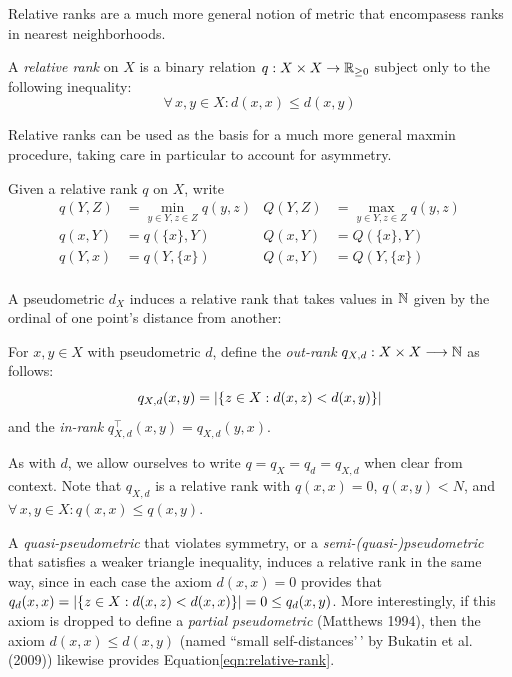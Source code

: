\documentclass{article}
\begin{document}
Relative ranks are a much more general notion of metric that encompasess
ranks in nearest neighborhoods.

\begin{definition}
    A \emph{relative rank} on $X$ is a binary relation $q: X \times X \to \mathbb{R}_{\geq 0}$ subject only to the following inequality:
    \begin{equation}\label{eqn:relative-rank}
        \forall\, x,y \in X : d(x,x) \leq d(x,y)
    \end{equation}
\end{definition}

Relative ranks can be used as the basis for a much more general maxmin
procedure, taking care in particular to account for asymmetry.

Given a relative rank \(q\) on \(X\), write \begin{align*}
    q(Y,Z) &= \min_{y\in Y,z\in Z}{q(y,z)} & Q(Y,Z) &= \max_{y\in Y,z\in Z}{q(y,z)} \\
    q(x,Y) &= q(\{x\},Y)                   & Q(x,Y) &= Q(\{x\},Y) \\
    q(Y,x) &= q(Y,\{x\})                   & Q(x,Y) &= Q(Y,\{x\}) \\
\end{align*}

A pseudometric \(d_X\) induces a relative rank that takes values in
\(\mathbb{N}\) given by the ordinal of one point's distance from another:

\begin{definition}
    For $x,y\in X$ with pseudometric $d$, define the \emph{out-rank} $q_{X,d} : X \times X \longrightarrow \mathbb{N}$ as follows:
    \begin{equation}\label{eqn:out-rank}
        q_{X,d}(x,y)=\abs{\{z\in X \where d(x,z) < d(x,y)\}}%
    \end{equation}
    and the \emph{in-rank} $q_{X,d}^\top(x,y) = q_{X,d}(y,x)$.
\end{definition}

As with \(d\), we allow ourselves to write \(q=q_X=q_d=q_{X,d}\) when
clear from context. Note that \(q_{X,d}\) is a relative rank with
\(q(x,x)=0\), \(q(x,y) < N\), and
\(\forall\, x,y \in X : q(x,x) \leq q(x,y)\).

A \emph{quasi-pseudometric} that violates symmetry, or a
\emph{semi-(quasi-)pseudometric} that satisfies a weaker triangle
inequality, induces a relative rank in the same way, since in each case
the axiom \(d(x,x) = 0\) provides that
\(q_d(x,x) = \lvert \{z\in X : d(x,z) < d(x,x)\}\rvert = 0 \leq q_d(x,y)\).
More interestingly, if this axiom is dropped to define a \emph{partial
pseudometric} (Matthews 1994), then the axiom \(d(x,x) \leq d(x,y)\)
(named ``small self-distances'\,' by Bukatin et al. (2009)) likewise
provides Equation\nbs\ref{eqn:relative-rank}.
\end{document}
